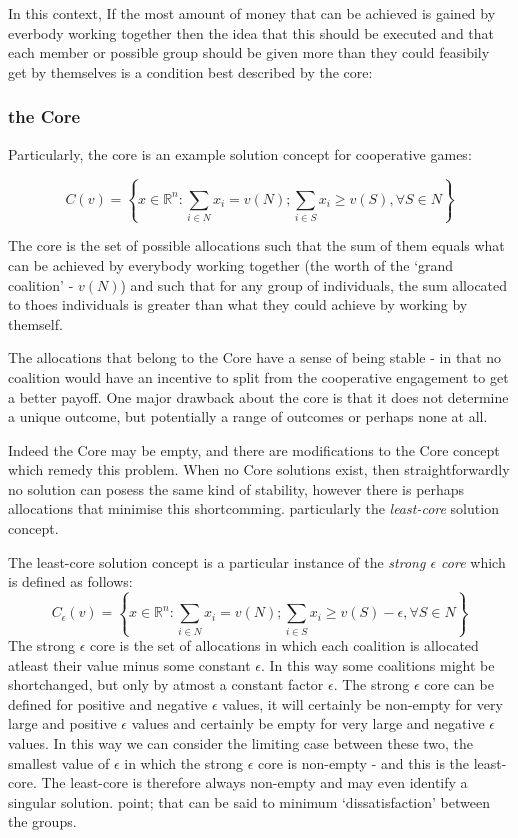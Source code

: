 In this context, If the most amount of money that can be achieved is gained by everbody working together then the idea that this should be executed and that each member or possible group should be given more than they could feasibily get by themselves is a condition best described by the core:

\subsubsection{the Core}

Particularly, the core is an example solution concept for cooperative games:

$$ C(v) = \left\{x\in\mathbb{R}^n : \sum_{i\in N}x_i=v(N); \sum_{i\in S}x_i \ge v(S), \forall S\in N \right\}$$

The core is the set of possible allocations such that the sum of them equals what can be achieved by everybody working together (the worth of the `grand coalition' - $v(N)$) and such that for any group of individuals, the sum allocated to thoes individuals is greater than what they could achieve by working by themself.

The allocations that belong to the Core have a sense of being stable - in that no coalition would have an incentive to split from the cooperative engagement to get a better payoff. One major drawback about the core is that it does not determine a unique outcome, but potentially a range of outcomes or perhaps none at all.

Indeed the Core may be empty, and there are modifications to the Core concept which remedy this problem.
When no Core solutions exist, then straightforwardly no solution can posess the same kind of stability, however there is perhaps allocations that minimise this shortcomming.
particularly the \textit{least-core} solution concept.

The least-core solution concept is a particular instance of the \textit{strong $\epsilon$ core} which is defined as follows:
$$ C_\epsilon(v) = \left\{x\in\mathbb{R}^n : \sum_{i\in N}x_i=v(N); \sum_{i\in S}x_i \ge v(S)-\epsilon, \forall S\in N \right\}$$
The strong $\epsilon$ core is the set of allocations in which each coalition is allocated atleast their value minus some constant $\epsilon$.
In this way some coalitions might be shortchanged, but only by atmost a constant factor $\epsilon$.
The strong $\epsilon$ core can be defined for positive and negative $\epsilon$ values, it will certainly be non-empty for very large and positive $\epsilon$ values and certainly be empty for very large and negative $\epsilon$ values.
In this way we can consider the limiting case between these two, the smallest value of $\epsilon$ in which the strong $\epsilon$ core is non-empty - and this is the least-core.\cite{doi:10.1287/moor.4.4.303}
The least-core is therefore always non-empty and may even identify a singular solution. point; that can be said to minimum `dissatisfaction' between the groups.

